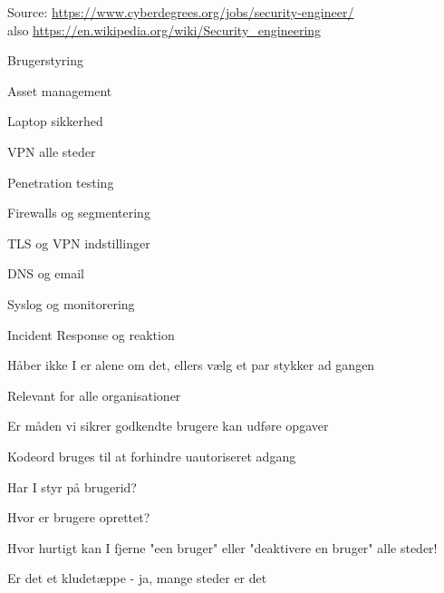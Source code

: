 \documentclass[Screen16to9,17pt]{foils}
\begin{document}
Source: \url{https://www.cyberdegrees.org/jobs/security-engineer/}\\
also
\url{https://en.wikipedia.org/wiki/Security_engineering}




\begin{list2}
\item Brugerstyring
\item Asset management
\item Laptop sikkerhed
\item VPN alle steder
\item Penetration testing
\item Firewalls og segmentering
\item TLS og VPN indstillinger
\item DNS og email
\item Syslog og monitorering
\item Incident Response og reaktion
\end{list2}

\vskip 5mm
\centerline{Håber ikke I er alene om det, ellers vælg et par stykker ad gangen}



\begin{list2}
\item Relevant for alle organisationer
\item Er måden vi sikrer godkendte brugere kan udføre opgaver
\item Kodeord bruges til at forhindre uautoriseret adgang
\end{list2}




\begin{list2}
\item Har I styr på brugerid?
\item Hvor er brugere oprettet?
\item Hvor hurtigt kan I fjerne "een bruger" eller "deaktivere en bruger" alle steder!
\item Er det et kludetæppe - ja, mange steder er det
\end{list2}



\end{document}
